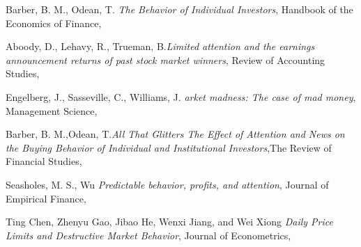 \documentclass[12pt]{article}
\begin{document}
\newpage

\begin{thebibliography}{100} 
\begin{LTR}
Barber, B. M., Odean, T. \emph{The Behavior of Individual Investors}, Handbook of the Economics of Finance, 
\end{LTR}

\begin{LTR}
Aboody, D., Lehavy, R., Trueman, B.\emph{Limited attention and the earnings announcement returns of past stock market winners}, Review of Accounting Studies, 
\end{LTR}
\begin{LTR}
Engelberg, J., Sasseville, C., Williams, J. \emph{arket madness: The case of mad money}, Management
Science, 
\end{LTR}
\begin{LTR}
Barber, B. M.,Odean, T.\emph{All That Glitters The Effect of Attention and News on the Buying Behavior of Individual and Institutional Investors},The Review of Financial Studies, 
\end{LTR}
\begin{LTR}
Seasholes, M. S., Wu \emph{Predictable behavior, profits, and attention}, Journal of Empirical Finance, 
\end{LTR}


\begin{LTR}
Ting Chen, Zhenyu Gao, Jibao He, Wenxi Jiang, and Wei Xiong \emph{Daily Price Limits and Destructive Market Behavior}, Journal of Econometrics, 
\end{LTR}



\end{thebibliography}
\end{document}
